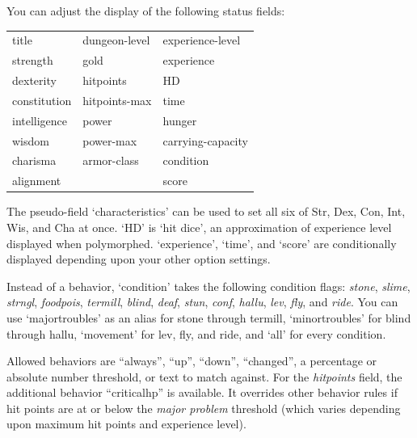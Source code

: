 \documentclass[titlepage]{article}
\begin{document}
You can adjust the display of the following status fields:
\begin{center}
\begin{tabular}{lll}
title & dungeon-level & experience-level\\
strength & gold & experience\\
dexterity & hitpoints & HD\\
constitution & hitpoints-max & time\\
intelligence & power & hunger\\
wisdom & power-max & carrying-capacity\\
charisma & armor-class & condition\\
alignment &  & score\\
\end{tabular}
\end{center}
The pseudo-field `characteristics' can be used to set all six
of Str, Dex, Con, Int, Wis, and Cha at once.  `HD' is `hit dice',
an approximation of experience level displayed when polymorphed.
`experience', `time', and `score' are conditionally displayed
depending upon your other option settings.

Instead of a behavior, `condition' takes the following condition flags:
\textit{stone}, \textit{slime}, \textit{strngl}, \textit{foodpois}, \textit{termill},
\textit{blind}, \textit{deaf}, \textit{stun}, \textit{conf}, \textit{hallu},
\textit{lev}, \textit{fly}, and \textit{ride}.
You can use `major\textunderscore troubles' as an alias
for stone through termill, `minor\textunderscore troubles' for blind through hallu,
`movement' for lev, fly, and ride, and `all' for every condition.

Allowed behaviors are ``always'', ``up'', ``down'', ``changed'', a
percentage or absolute number threshold, or text to match against.
For the \textit{hitpoints} field, the additional behavior ``criticalhp''
is available.
It overrides other behavior rules if
hit points are at or below the \textit{major problem} threshold
(which varies depending upon maximum hit points and experience level).
\end{document}
